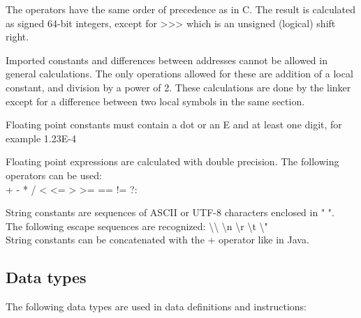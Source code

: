 \documentclass[forwardcom.tex]{subfiles}
\begin{document}
The operators have the same order of precedence as in C.
The result is calculated as signed 64-bit integers, except for \textgreater\textgreater\textgreater \hspace{0.5mm} which is an unsigned (logical) shift right.
\vspace{2mm}

Imported constants and differences between addresses cannot be allowed in general calculations. 
The only operations allowed for these are addition of a local constant, and division by a power of 2.
These calculations are done by the linker except for a difference between two local symbols in the same section.
\vspace{2mm}

Floating point constants must contain a dot or an E and at least one digit, for example 1.23E-4
\vspace{2mm}

Floating point expressions are calculated with double precision. The following operators can be used: \\
+ \hspace{2mm} - \hspace{2mm} * \hspace{2mm} / \hspace{2mm} 
\textless \hspace{2mm} \textless= \hspace{2mm} \textgreater \hspace{2mm} \textgreater= \hspace{2mm} 
 == \hspace{2mm} != \hspace{2mm} ?: 
\vspace{2mm}

String constants are sequences of ASCII or UTF-8 characters enclosed in " ".\\
The following escape sequences are recognized: \textbackslash\textbackslash \hspace{1mm}
\textbackslash n \textbackslash r  \textbackslash t  \textbackslash " \\
String constants can be concatenated with the + operator like in Java.
\vspace{2mm}

\subsection{Data types} \label{assemblyDataTypes}
The following data types are used in data definitions and instructions:
\end{document}

